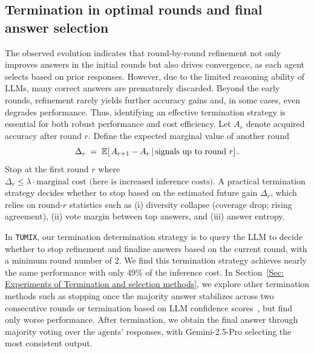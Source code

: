 \vspace{-6pt}
\subsection{Termination in optimal rounds and final answer selection}
\label{subsection:Termination and selection}
\vspace{-6pt}
The observed evolution indicates that round-by-round refinement not only improves answers in the initial rounds but also drives convergence, as each agent selects based on prior responses. However, due to the limited reasoning ability of LLMs, many correct answers are prematurely discarded. Beyond the early rounds, refinement rarely yields further accuracy gains and, in some cases, even degrades performance. Thus, identifying an effective termination strategy is essential for both robust performance and cost efficiency. Let \(A_r\) denote acquired accuracy after round \(r\).
Define the expected marginal value of another round
\begin{equation}
  \Delta_r \;=\; \mathbb{E}\!\left[\, A_{r+1}-A_r \,\middle|\, \text{signals up to round } r \right].
\end{equation}
Stop at the first round \(r\) where \(\Delta_r \le \lambda \cdot \text{marginal cost (here is increased inference costs)}\).
A practical termination strategy decides whether to stop based on the estimated future gain $\Delta_r$, which relies on round-\(r\) statistics such as (i) diversity collapse (coverage drop; rising agreement), (ii) vote margin between top answers, and (iii) answer entropy.

In \texttt{TUMIX}, our termination determination strategy is to query the LLM to decide whether to stop refinement and finalize answers based on the current round, with a minimum round number of 2. We find this termination strategy achieves nearly the same performance with only 49\% of the inference cost. In Section~\ref{Sec: Experiments of Termination and selection methods}, we explore other termination methods such as stopping once the majority answer stabilizes across two consecutive rounds or termination based on LLM confidence scores~\citep{fu2025deep}, but find only worse performance. After termination, we obtain the final answer through majority voting over the agents’ responses, with Gemini-2.5-Pro selecting the most consistent output.